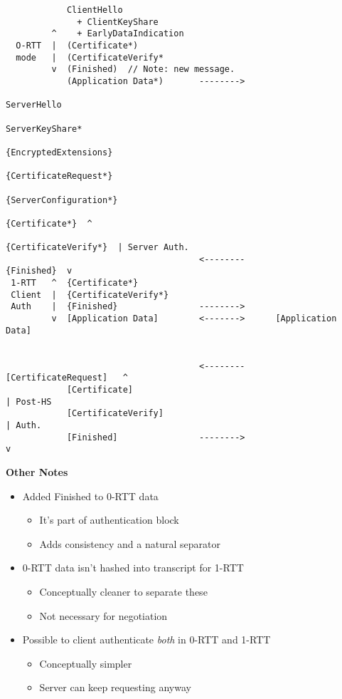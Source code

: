 \documentclass[helvetica]{seminar}
\newcommand{\heading}[1]{%
  \begin{center} 
    \large\bf 
    #1 
  \end{center} 
  \vspace{.4 in}}
\begin{document}
\begin{slide}
\begin{scriptsize}
\begin{verbatim}
            ClientHello
              + ClientKeyShare
         ^    + EarlyDataIndication
  O-RTT  |  (Certificate*)
  mode   |  (CertificateVerify*
         v  (Finished)  // Note: new message.
            (Application Data*)       -------->
                                                            ServerHello
                                                        ServerKeyShare*
                                                  {EncryptedExtensions}
                                                  {CertificateRequest*}
                                                 {ServerConfiguration*} 
                                                         {Certificate*}  ^
                                                   {CertificateVerify*}  | Server Auth.
                                      <--------              {Finished}  v
 1-RTT   ^  {Certificate*}
 Client  |  {CertificateVerify*}
 Auth    |  {Finished}                -------->
         v  [Application Data]        <------->      [Application Data]

                         
                                      <--------    [CertificateRequest]   ^
            [Certificate]                                                 | Post-HS
            [CertificateVerify]                                           | Auth.
            [Finished]                -------->                           v
\end{verbatim}
\end{scriptsize}
\end{slide}

\begin{slide}
\heading{Other Notes}

\begin{itemize}
\item Added Finished to 0-RTT data
  \begin{itemize}
  \item It's part of authentication block
  \item Adds consistency and a natural separator
  \end{itemize}

\item 0-RTT data isn't hashed into transcript for 1-RTT
  \begin{itemize}
  \item Conceptually cleaner to separate these
  \item Not necessary for negotiation
  \end{itemize}

\item Possible to client authenticate \emph{both} in 0-RTT and 1-RTT
  \begin{itemize}
  \item Conceptually simpler
  \item Server can keep requesting anyway
  \end{itemize}
\end{itemize}

\end{slide}
\end{document}
